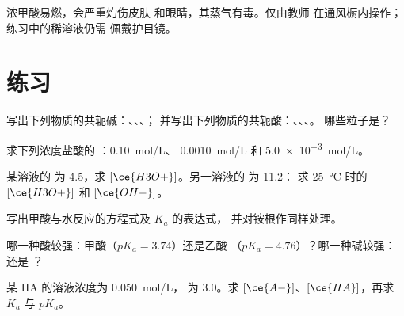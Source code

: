 \begin{safety}{}
浓甲酸易燃，会严重灼伤皮肤
和眼睛，其蒸气有毒。仅由教师
在通风橱内操作；练习中的稀溶液仍需
佩戴护目镜。
\end{safety}

\section{练习}

\begin{exercise}[$\star$]\label{exo:g12:ka-and-pka:1}
写出下列物质的共轭碱：、、、；
并写出下列物质的共轭酸：、、、。
哪些粒子是？
\end{exercise}

\begin{exercise}[$\star$]\label{exo:g12:ka-and-pka:2}
求下列浓度盐酸的 ：\qty{0.10}{mol/L}、
\qty{0.0010}{mol/L} 和 \qty{5.0e-3}{mol/L}。
\end{exercise}

\begin{exercise}[$\star$]\label{exo:g12:ka-and-pka:3}
某溶液的  为 4.5，求 $[\ce{H3O+}]$。另一溶液的  为 11.2：
求 \qty{25}{\celsius} 时的 $[\ce{H3O+}]$ 和 $[\ce{OH-}]$。
\end{exercise}

\begin{exercise}[$\star$]\label{exo:g12:ka-and-pka:4}
写出甲酸与水反应的方程式及 $K_a$ 的表达式，
并对铵根作同样处理。
\end{exercise}

\begin{exercise}[$\star$]\label{exo:g12:ka-and-pka:5}
哪一种酸较强：甲酸（$pK_a = 3.74$）还是乙酸
（$pK_a = 4.76$）？哪一种碱较强： 还是
？
\end{exercise}

\begin{exercise}[$\star\star$]\label{exo:g12:ka-and-pka:6}
某 HA 的溶液浓度为 \qty{0.050}{mol/L}， 为 3.0。求
$[\ce{A-}]$、$[\ce{HA}]$，再求 $K_a$ 与 $pK_a$。
\end{exercise}

